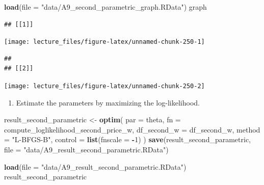 \documentclass[]{book}
\newenvironment{Shaded}{\begin{snugshade}}{\end{snugshade}}
\newcommand{\KeywordTok}[1]{\textcolor[rgb]{0.13,0.29,0.53}{\textbf{#1}}}
\newcommand{\DataTypeTok}[1]{\textcolor[rgb]{0.13,0.29,0.53}{#1}}
\newcommand{\DecValTok}[1]{\textcolor[rgb]{0.00,0.00,0.81}{#1}}
\newcommand{\StringTok}[1]{\textcolor[rgb]{0.31,0.60,0.02}{#1}}
\newcommand{\OperatorTok}[1]{\textcolor[rgb]{0.81,0.36,0.00}{\textbf{#1}}}
\newcommand{\NormalTok}[1]{#1}
\providecommand{\tightlist}{%
  \setlength{\itemsep}{0pt}\setlength{\parskip}{0pt}}
\begin{document}
\begin{Shaded}
\begin{Highlighting}[]
\KeywordTok{load}\NormalTok{(}\DataTypeTok{file =} \StringTok{"data/A9_second_parametric_graph.RData"}\NormalTok{)}
\NormalTok{graph}
\end{Highlighting}
\end{Shaded}

\begin{verbatim}
## [[1]]
\end{verbatim}

\begin{center}\texttt{[image: lecture\_files/figure-latex/unnamed-chunk-250-1]} \end{center}

\begin{verbatim}
## 
## [[2]]
\end{verbatim}

\begin{center}\texttt{[image: lecture\_files/figure-latex/unnamed-chunk-250-2]} \end{center}

\begin{enumerate}
\def\labelenumi{\arabic{enumi}.}
\setcounter{enumi}{3}
\tightlist
\item
  Estimate the parameters by maximizing the log-likelihood.
\end{enumerate}

\begin{Shaded}
\begin{Highlighting}[]
\NormalTok{result_second_parametric <-}
\StringTok{  }\KeywordTok{optim}\NormalTok{(}
    \DataTypeTok{par =}\NormalTok{ theta,}
    \DataTypeTok{fn =}\NormalTok{ compute_loglikelihood_second_price_w,}
    \DataTypeTok{df_second_w =}\NormalTok{ df_second_w,}
    \DataTypeTok{method =} \StringTok{"L-BFGS-B"}\NormalTok{,}
    \DataTypeTok{control =} \KeywordTok{list}\NormalTok{(}\DataTypeTok{fnscale =} \OperatorTok{-}\DecValTok{1}\NormalTok{)}
\NormalTok{  )}
\KeywordTok{save}\NormalTok{(result_second_parametric, }\DataTypeTok{file =} \StringTok{"data/A9_result_second_parametric.RData"}\NormalTok{)}
\end{Highlighting}
\end{Shaded}

\begin{Shaded}
\begin{Highlighting}[]
\KeywordTok{load}\NormalTok{(}\DataTypeTok{file =} \StringTok{"data/A9_result_second_parametric.RData"}\NormalTok{)}
\NormalTok{result_second_parametric}
\end{Highlighting}
\end{Shaded}
\end{document}
